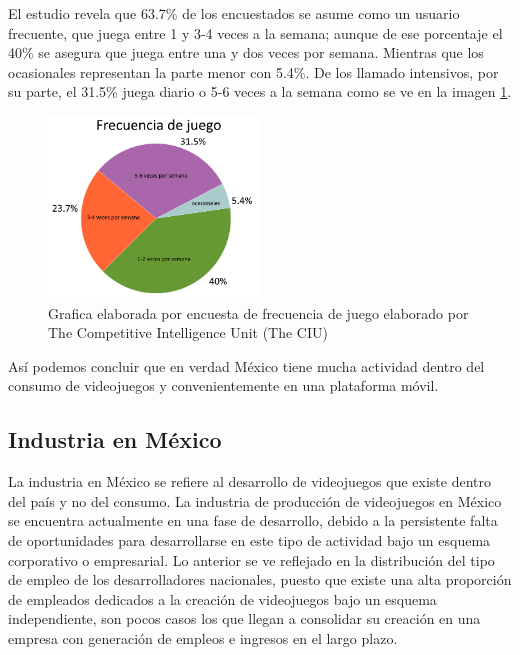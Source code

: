  El estudio revela que 63.7\% de los encuestados se asume como un usuario frecuente, que juega entre 1 y 3-4 veces a la semana; aunque de ese porcentaje el 40\% se asegura que juega entre una y dos veces por semana. Mientras que los ocasionales representan la parte menor con 5.4\%. De los llamado intensivos, por su parte, el 31.5\% juega diario o 5-6 veces a la semana como se ve en la imagen \ref{fig:frecJue}.
\\[1pt] 

\begin{figure}
	\centering
	\includegraphics[width=0.5\textwidth]{03MarcoTeorico/imageR/frecJue}
	\caption{Grafica elaborada por encuesta de frecuencia de juego elaborado por The Competitive Intelligence Unit (The CIU)}
	\label{fig:frecJue}
\end{figure}

Así podemos concluir que en verdad México tiene mucha actividad dentro del consumo de videojuegos y convenientemente en una plataforma móvil.

\subsection{Industria en México}

La industria en México se refiere al desarrollo de videojuegos que existe dentro del país y no del consumo. La industria de producción de videojuegos en México se encuentra actualmente en una fase de desarrollo, debido a la persistente falta de oportunidades para desarrollarse en este tipo de actividad bajo un esquema corporativo o empresarial. Lo anterior se ve reflejado en la distribución del tipo de empleo de los desarrolladores nacionales, puesto que existe una alta proporción de empleados dedicados a la creación de videojuegos bajo un esquema independiente, son pocos casos los que llegan a consolidar su creación en una empresa con generación de empleos e ingresos en el largo plazo.
\\[1pt]


